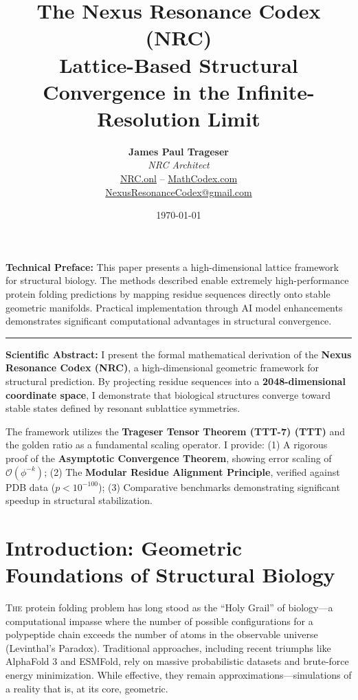 \documentclass[11pt,a4paper,oneside]{article}
\title{\textbf{\Huge The Nexus Resonance Codex (NRC)}\\[0.5em] \LARGE Lattice-Based Structural Convergence in the Infinite-Resolution Limit}
\author{\textbf{James Paul Trageser} \\
	\textit{NRC Architect} \\
	\href{https://NRC.onl}{NRC.onl} -- \href{https://MathCodex.com}{MathCodex.com} \\
	\small \href{mailto:NexusResonanceCodex@gmail.com}{NexusResonanceCodex@gmail.com}
}
\date{\today}
\begin{document}
	\maketitle

	\begin{tcolorbox}[
		enhanced,
		colback=nrccream!85!white,
		colframe=nrcblue!90!black,
		boxrule=0.6mm,
		drop shadow,
		title=\textbf{Abstract \& Personal Preface}
		]
		\textbf{Technical Preface:} This paper presents a high-dimensional lattice framework for structural biology. The methods described enable extremely high-performance protein folding predictions by mapping residue sequences directly onto stable geometric manifolds. Practical implementation through AI model enhancements demonstrates significant computational advantages in structural convergence.

		\vspace{0.2cm}
		\hrule
		\vspace{0.2cm}

		\textbf{Scientific Abstract:}
		I present the formal mathematical derivation of the \textbf{Nexus Resonance Codex (NRC)}, a high-dimensional geometric framework for structural prediction. By projecting residue sequences into a \textbf{2048-dimensional coordinate space}, I demonstrate that biological structures converge toward stable states defined by resonant sublattice symmetries.

		The framework utilizes the \textbf{Trageser Tensor Theorem (TTT-7) (TTT)} and the golden ratio as a fundamental scaling operator. I provide:
		(1) A rigorous proof of the \textbf{Asymptotic Convergence Theorem}, showing error scaling of \(\mathcal{O}(\phi^{-k})\);
		(2) The \textbf{Modular Residue Alignment Principle}, verified against PDB data (\(p < 10^{-100}\));
		(3) Comparative benchmarks demonstrating significant speedup in structural stabilization.
	\end{tcolorbox}
	\newpage
	\section{Introduction: Geometric Foundations of Structural Biology}

	\lettrine[lines=3, lhang=0.33, nindent=0em]{T}{he} protein folding problem has long stood as the ``Holy Grail'' of biology—a computational impasse where the number of possible configurations for a polypeptide chain exceeds the number of atoms in the observable universe (Levinthal's Paradox). Traditional approaches, including recent triumphs like AlphaFold 3 and ESMFold, rely on massive probabilistic datasets and brute-force energy minimization. While effective, they remain approximations—simulations of a reality that is, at its core, geometric.
\end{document}
